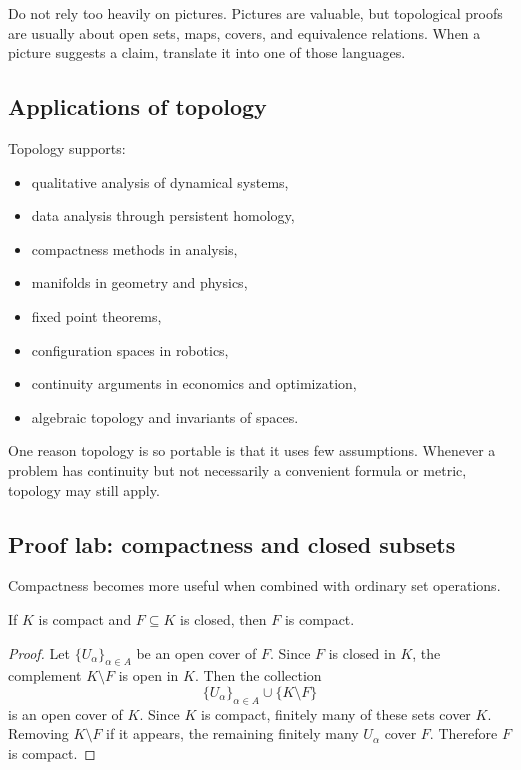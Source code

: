 \begin{trapbox}
Do not rely too heavily on pictures. Pictures are valuable, but topological
proofs are usually about open sets, maps, covers, and equivalence relations.
When a picture suggests a claim, translate it into one of those languages.
\end{trapbox}

\subsection{Applications of topology}

Topology supports:

\begin{itemize}
\item qualitative analysis of dynamical systems,
\item data analysis through persistent homology,
\item compactness methods in analysis,
\item manifolds in geometry and physics,
\item fixed point theorems,
\item configuration spaces in robotics,
\item continuity arguments in economics and optimization,
\item algebraic topology and invariants of spaces.
\end{itemize}

One reason topology is so portable is that it uses few assumptions. Whenever a
problem has continuity but not necessarily a convenient formula or metric,
topology may still apply.

\subsection{Proof lab: compactness and closed subsets}

Compactness becomes more useful when combined with ordinary set operations.

\begin{theorem}
If $K$ is compact and $F\subseteq K$ is closed, then $F$ is compact.
\end{theorem}

\begin{proof}
Let $\{U_\alpha\}_{\alpha\in A}$ be an open cover of $F$. Since $F$ is closed
in $K$, the complement $K\setminus F$ is open in $K$. Then the collection
\[
\{U_\alpha\}_{\alpha\in A}\cup\{K\setminus F\}
\]
is an open cover of $K$. Since $K$ is compact, finitely many of these sets cover
$K$. Removing $K\setminus F$ if it appears, the remaining finitely many
$U_\alpha$ cover $F$. Therefore $F$ is compact.
\end{proof}

